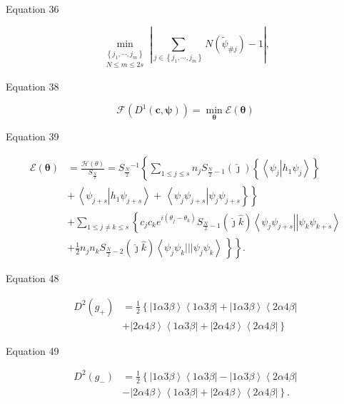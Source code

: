 \documentclass[aps]{revtex4}%
\begin{document}
Equation 36%

\[
\min_{\substack{\left\{  j_{1},\cdots,j_{m}\right\}  \\N\leq m\leq
2s}}\left\vert \sum_{j\in\left\{  j_{1},\cdots,j_{m}\right\}  }N\left(
\tilde{\psi}_{\#j}\right)  -1\right\vert ,
\]


Equation 38%

\[
\mathcal{F}\left(  D^{1}\left(  \boldsymbol{c},\boldsymbol{\psi}\right)
\right)  =\min_{\boldsymbol{\theta}}\mathcal{E}\left(  \boldsymbol{\theta
}\right)
\]


Equation 39%

\begin{align*}
\mathcal{E}\left(  \boldsymbol{\theta}\right)   &  =\frac{\mathcal{H}\left(
\theta\right)  }{S_{\frac{N}{2}}}=S_{\frac{N}{2}}{}^{-1}\left\{  \sum_{1\leq
j\leq s}n_{j}S_{\frac{N}{2}-1}\left(  \hat{\jmath}\right)  \left\{
\left\langle \psi_{j}\left\vert h_{1}\psi_{j}\right.  \right\rangle \right\}
\right. \\
&  \left.  \left.  +\,\left\langle \psi_{j+s}\left\vert h_{1}\psi
_{j+s}\right.  \right\rangle +\,\left\langle \psi_{j}\psi_{j+s}\right\vert
\psi_{j}\psi_{j+s}\right\}  \right\} \\
&  +\sum_{1\leq j\neq k\leq s}\left\{  c_{j}c_{k}e^{i\left(  \theta_{j}%
-\theta_{k}\right)  }S_{\frac{N}{2}-1}\left(  \hat{\jmath}\hat{k}\right)
\left\langle \psi_{j}\psi_{j+s}\right\vert \left\vert \psi_{k}\psi
_{k+s}\right\rangle \right. \\
&  \left.  \left.  +\frac{1}{2}n_{j}n_{k}S_{\frac{N}{2}-2}\left(  \hat{\jmath
}\hat{k}\right)  \left\langle \psi_{j}\psi_{k}|||\psi_{j}\psi_{k}\right\rangle
\,\right\}  \right\}  .
\end{align*}


Equation 48%

\begin{align*}
D^{2}\left(  g_{+}\right)   &  =\frac{1}{2}\left\{  \left\vert 1\alpha
3\beta\right\rangle \left\langle 1\alpha3\beta\right\vert +\left\vert
1\alpha3\beta\right\rangle \left\langle 2\alpha4\beta\right\vert \right. \\
&  +\left.  \left\vert 2\alpha4\beta\right\rangle \left\langle 1\alpha
3\beta\right\vert +\left\vert 2\alpha4\beta\right\rangle \left\langle
2\alpha4\beta\right\vert \right\}
\end{align*}


Equation 49%

\begin{align*}
D^{2}\left(  g_{-}\right)   &  =\frac{1}{2}\left\{  \left\vert 1\alpha
3\beta\right\rangle \left\langle 1\alpha3\beta\right\vert -\left\vert
1\alpha3\beta\right\rangle \left\langle 2\alpha4\beta\right\vert \right. \\
&  -\left.  \left\vert 2\alpha4\beta\right\rangle \left\langle 1\alpha
3\beta\right\vert +\left\vert 2\alpha4\beta\right\rangle \left\langle
2\alpha4\beta\right\vert \right\}  .
\end{align*}
\end{document}

